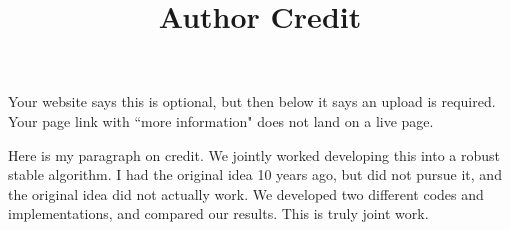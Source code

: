 \documentclass{article}
\title{Author Credit}
\date{}
\begin{document}
\maketitle

Your website says this is optional, but then below it says an upload is
required.   Your page link with ``more information" does not land on a
live page.

Here is my paragraph on credit. We jointly worked developing this into a
robust stable algorithm. I had the original idea 10 years ago, but did
not pursue it, and the original idea did not actually work.
We developed two different codes and implementations, and compared our
results. This is truly joint work.
\end{document}
